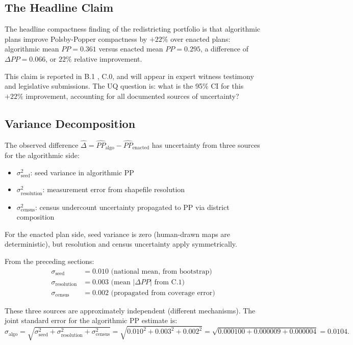 
\subsection{The Headline Claim}

The headline compactness finding of the redistricting portfolio is
that algorithmic plans improve Polsby-Popper compactness by $+22\%$
over enacted plans: algorithmic mean $PP = 0.361$ versus enacted
mean $PP = 0.295$, a difference of $\Delta PP = 0.066$, or
$22\%$ relative improvement.

This claim is reported in B.1 \citep{b1paper}, C.0, and will appear
in expert witness testimony and legislative submissions. The UQ
question is: what is the 95\% CI for this $+22\%$ improvement,
accounting for all documented sources of uncertainty?

\subsection{Variance Decomposition}

The observed difference $\hat\Delta = \hat{PP}_\text{algo} -
\hat{PP}_\text{enacted}$ has uncertainty from three sources for the
algorithmic side:
\begin{itemize}
  \item $\sigma^2_\text{seed}$: seed variance in algorithmic PP
  \item $\sigma^2_\text{resolution}$: measurement error from shapefile
    resolution
  \item $\sigma^2_\text{census}$: census undercount uncertainty
    propagated to PP via district composition
\end{itemize}

For the enacted plan side, seed variance is zero (human-drawn maps
are deterministic), but resolution and census uncertainty apply
symmetrically.

From the preceding sections:
\begin{align}
  \sigma_\text{seed}      &= 0.010 \text{ (national mean, from bootstrap)} \\
  \sigma_\text{resolution} &= 0.003 \text{ (mean $|\Delta PP|$ from C.1)} \\
  \sigma_\text{census}    &= 0.002 \text{ (propagated from coverage error)}
\end{align}

These three sources are approximately independent (different mechanisms).
The joint standard error for the algorithmic PP estimate is:
\begin{equation}
  \sigma_\text{algo} = \sqrt{\sigma^2_\text{seed} + \sigma^2_\text{resolution}
                     + \sigma^2_\text{census}}
  = \sqrt{0.010^2 + 0.003^2 + 0.002^2}
  = \sqrt{0.000100 + 0.000009 + 0.000004}
  = 0.0104.
\end{equation}

